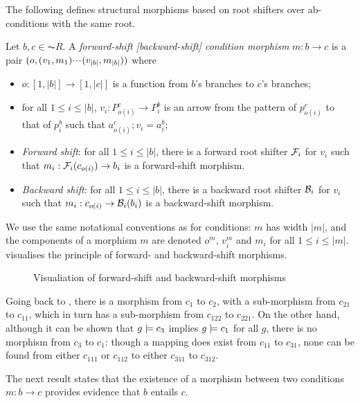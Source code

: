 The following defines structural morphisms based on root shifters over ab-conditions with the same root.

\begin{definition}
  Let $b,c \in \AC{R}$. A \emph{forward-shift [backward-shift] condition morphism} $m: b \to c$ is a pair $(o,(v_1,m_1){\cdotp\mkern-2mu\cdotp\mkern-2mu\cdotp\mkern1mu} (v_{|b|},m_{|b|}))$ where
  \begin{itemize}[topsep=\smallskipamount]
  \item $o:[1,|b|]\to[1,|c|]$ is a function from $b$'s branches to $c$'s branches;
  \item for all $1\leq i\leq |b|$, $v_i:P^c_{o(i)}\to P^b_i$ is an arrow from the pattern of $p^c_{o(i)}$ to that of $p^b_i$ such that $a^c_{o(i)};v_i=a^b_i$;
  \item\emph{Forward shift}: for all $1\leq i\leq |b|$, there is a forward root shifter $\mathcal{F}_i$ for $v_i$ such that $m_i:\mathcal{F}_i(c_{o(i)})\to b_i$ is a forward-shift morphism.
  \item\emph{Backward shift}: for all $1\leq i\leq |b|$, there is a backward root shifter $\mathcal{B}_i$ for $v_i$ such that $m_i:c_{o(i)}\to \mathcal{B}_i(b_i)$ is a backward-shift morphism.
  \end{itemize}
\end{definition}
%
We use the same notational conventions as for conditions: $m$ has width $|m|$, and the components of a morphism $m$ are denoted $o^m$, $v^m_i$ and $m_i$ for all $1\leq i\leq |m|$.  visualises the principle of forward- and backward-shift morphisms.
%
\begin{figure}
\centering

\caption{Visualiation of forward-shift and backward-shift morphisms}
\end{figure}

\begin{example}
Going back to , there is a morphism from $c_1$ to $c_2$, with a sub-morphism from $c_{21}$ to $c_{11}$, which in turn has a sub-morphism from $c_{122}$ to $c_{221}$. On the other hand, although it can be shown that $g\models c_3$ implies $g\models c_1$ for all $g$, there is no morphism from $c_3$ to $c_1$: though a mapping does exist from $c_{11}$ to $c_{31}$, none can be found from either $c_{111}$ or $c_{112}$ to either $c_{311}$ to $c_{312}$.
\end{example}
%
The next result states that the existence of a morphism between two conditions $m: b \to c$ provides evidence that $b$ entails $c$.

